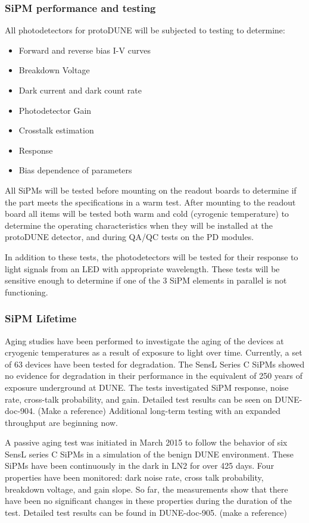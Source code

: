\subsubsection{SiPM performance and testing}

All photodetectors for protoDUNE will be subjected to testing to determine:
\begin{itemize}
\item Forward and reverse bias I-V curves
\item Breakdown Voltage
\item Dark current and dark count rate
\item Photodetector Gain 
\item Crosstalk estimation
\item Response
\item Bias dependence of parameters
\end{itemize}
All SiPMs will be tested before mounting on the readout boards to determine
if the part meets the specifications in a warm test.  After mounting to
the readout board all items will be tested both warm and cold (cyrogenic 
temperature) to determine the operating characteristics when they will be 
installed at the protoDUNE detector, and during QA/QC tests on the PD modules.

In addition to these tests, the photodetectors will be tested for their
response to light signals from an LED with appropriate wavelength.
These tests will be sensitive enough to determine if one of the 3 SiPM
elements in parallel is not functioning.


\subsubsection{SiPM Lifetime}
Aging studies have been performed to investigate the aging of the devices at 
cryogenic temperatures as a result of exposure to light over time.
Currently, a set of 63 devices have been tested for degradation.
The SensL Series C SiPMs showed no evidence for degradation in their 
performance in the equivalent of 250 years of exposure underground at DUNE. 
The tests investigated SiPM response, noise rate, cross-talk probability, and
gain.
Detailed test results can be seen on DUNE-doc-904. (Make a reference) 
Additional long-term testing with an expanded throughput are beginning
now.

A passive aging test was initiated in March 2015 to follow the
behavior of six SensL series C SiPMs in a simulation of the benign
DUNE environment. These SiPMs have been continuously in the
dark in LN2 for over 425 days. Four properties have been monitored:
dark noise rate, cross talk probability, breakdown voltage, and gain
slope. So far, the measurements show that there
have been no significant changes in these properties during the
duration of the test.
Detailed test results can be found in DUNE-doc-905. (make a reference)

